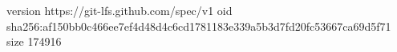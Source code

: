 version https://git-lfs.github.com/spec/v1
oid sha256:af150bb0c466ee7ef4d48d4c6cd1781183e339a5b3d7fd20fc53667ca69d5f71
size 174916
